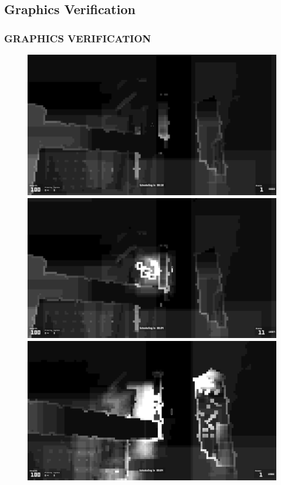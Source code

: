 \subsection{Graphics Verification}
\begin{frame}
\frametitle{GRAPHICS VERIFICATION}

\begin{figure}[ht]
  \begin{minipage}[b]{0.3\linewidth}
    \centering
    \includegraphics[width=1.0\textwidth]{img/tbds1.png}
  \end{minipage}
  \hspace{0.25cm}
  \begin{minipage}[b]{0.3\linewidth}
    \centering
    \includegraphics[width=1.0\textwidth]{img/tbds2.png}
  \end{minipage}
  \hspace{0.25cm}
  \begin{minipage}[b]{0.3\linewidth}
    \centering
    \includegraphics[width=1.0\textwidth]{img/tbds3.png}

\end{minipage}
\end{figure}
\end{frame}
